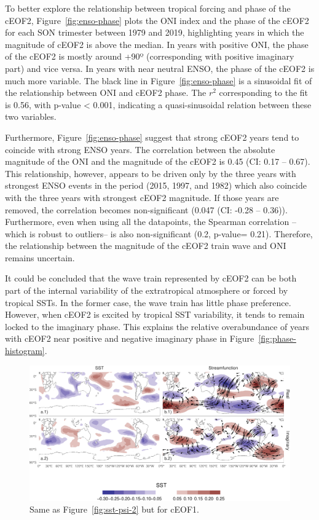 \documentclass[smallextended]{svjour3}       %
\begin{document}
To better explore the relationship between tropical forcing and phase of the cEOF2, Figure~\ref{fig:enso-phase} plots the ONI index and the phase of the cEOF2 for each SON trimester between 1979 and 2019, highlighting years in which the magnitude of cEOF2 is above the median. In years with positive ONI, the phase of the cEOF2 is mostly around +90º (corresponding with positive imaginary part) and vice versa. In years with near neutral ENSO, the phase of the cEOF2 is much more variable. The black line in Figure~\ref{fig:enso-phase} is a sinusoidal fit of the relationship between ONI and cEOF2 phase. The \(r^2\) corresponding to the fit is 0.56, with p-value \textless{} 0.001, indicating a quasi-sinusoidal relation between these two variables.

Furthermore, Figure~\ref{fig:enso-phase} suggest that strong cEOF2 years tend to coincide with strong ENSO years. The correlation between the absolute magnitude of the ONI and the magnitude of the cEOF2 is 0.45 (CI: 0.17 -- 0.67). This relationship, however, appears to be driven only by the three years with strongest ENSO events in the period (2015, 1997, and 1982) which also coincide with the three years with strongest cEOF2 magnitude. If those years are removed, the correlation becomes non-significant (0.047 (CI: -0.28 -- 0.36)). Furthermore, even when using all the datapoints, the Spearman correlation --which is robust to outliers-- is also non-significant (0.2, p-value= 0.21). Therefore, the relationship between the magnitude of the cEOF2 train wave and ONI remains uncertain.

It could be concluded that the wave train represented by cEOF2 can be both part of the internal variability of the extratropical atmosphere or forced by tropical SSTs. In the former case, the wave train has little phase preference. However, when cEOF2 is excited by tropical SST variability, it tends to remain locked to the imaginary phase. This explains the relative overabundance of years with cEOF2 near positive and negative imaginary phase in Figure~\ref{fig:phase-histogram}.



\begin{figure}
\includegraphics{../figures/sst-psi-1-1} \caption{Same as Figure~\ref{fig:sst-psi-2} but for cEOF1.}\label{fig:sst-psi-1}
\end{figure}
\end{document}
